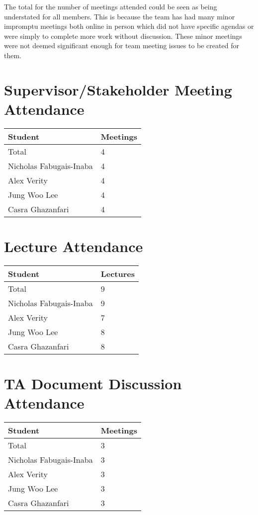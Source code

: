 \documentclass{article}
\begin{document}
The total for the number of meetings attended could be seen as
being understated for all members. This is because the team has 
had many minor impromptu meetings both online in person which 
did not have specific agendas or were simply to complete more work
without discussion. These minor meetings were not deemed significant
enough for team meeting issues to be created for them.

\section{Supervisor/Stakeholder Meeting Attendance}

\begin{table}[H]
\centering
\begin{tabular}{ll}
\toprule
\textbf{Student} & \textbf{Meetings}\\
\midrule
Total & 4\\
Nicholas Fabugais-Inaba & 4 \\
Alex Verity & 4 \\
Jung Woo Lee & 4 \\
Casra Ghazanfari & 4 \\
\bottomrule
\end{tabular}
\end{table}

\section{Lecture Attendance}

\begin{table}[H]
\centering
\begin{tabular}{ll}
\toprule
\textbf{Student} & \textbf{Lectures}\\
\midrule
Total & 9\\
Nicholas Fabugais-Inaba & 9 \\
Alex Verity & 7 \\
Jung Woo Lee & 8 \\
Casra Ghazanfari & 8 \\
\bottomrule
\end{tabular}
\end{table}

\section{TA Document Discussion Attendance}

\begin{table}[H]
\centering
\begin{tabular}{ll}
\toprule
\textbf{Student} & \textbf{Meetings}\\
\midrule
Total & 3\\
Nicholas Fabugais-Inaba & 3 \\
Alex Verity & 3 \\
Jung Woo Lee & 3 \\
Casra Ghazanfari & 3 \\
\bottomrule
\end{tabular}
\end{table}
\end{document}
